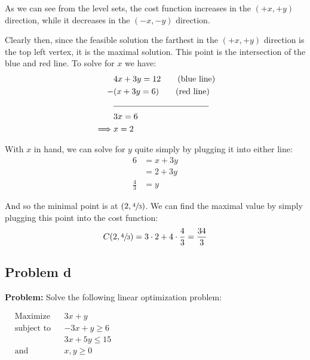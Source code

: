 \documentclass{article}
\begin{document}
As we can see from the level sets, the cost function increases in the $(+x, +y)$ direction, while it decreases in the $(-x,-y)$ direction.

Clearly then, since the feasible solution the farthest in the $(+x, +y)$ direction is the top left vertex, it is the maximal solution. This point is the intersection of the blue and red line. To solve for $x$ we have:
\begin{align*}
    &4x+3y=12\tag{blue line}\\
    -&(x+3y=6)\tag{red line}\\
    &\noindent\rule{4cm}{0.4pt}\\
    &3x=6\\
    \implies&x=2
\end{align*}

With $x$ in hand, we can solve for $y$ quite simply by plugging it into either line:
\begin{align*}
    6&=x+3y\tag{red line}\\
    &=2+3y\tag{plug in $x=2$}\\
    \frac{4}{3}&=y
\end{align*}

And so the minimal point is at $(2,\sfrac{4}{3})$. We can find the maximal value by simply plugging this point into the cost function:
$$C(2,\sfrac{4}{3})=3\cdot2+4\cdot\frac{4}{3}=\frac{34}{3}$$
\newpage

\subsection*{Problem d}
\noindent\textbf{Problem:} Solve the following linear optimization problem:
\begin{center}
    $\begin{aligned}
        &{\text{Maximize}}
        &&3x+y \\
        &{\text{subject to}}
        &&-3x+y\ge6\\
        &
        &&3x+5y\le15\\
        &{\text{and}}
        &&x,y\ge0
    \end{aligned}$
\end{center}
\end{document}
